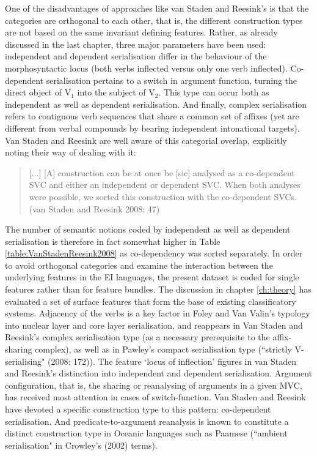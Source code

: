 One of the disadvantages of approaches like van Staden and Reesink's is that the categories are orthogonal to each other, that is, the different construction types are not based on the same invariant defining features. Rather, as already discussed in the last chapter, three major parameters have been used: independent and dependent serialisation differ in the behaviour of the morphosyntactic locus (both verbs inflected versus only one verb inflected). Co-dependent serialisation pertains to a switch in argument function, turning the direct object of V$_1$ into the subject of V$_2$. This type can occur both as independent as well as dependent serialisation. And finally, complex serialisation refers to contiguous verb sequences that share a common set of affixes (yet are different from verbal compounds by bearing independent intonational targets). Van Staden and Reesink are well aware of this categorial overlap, explicitly noting their way of dealing with it: 

\begin{quote}
[...] [A] construction can be at once be [sic] analysed as a co-dependent SVC and either an independent or dependent SVC. When both analyses were possible, we sorted this construction with the co-dependent SVCs. (van Staden and Reesink 2008: 47)
\end{quote}

The number of semantic notions coded by independent as well as dependent serialisation is therefore in fact somewhat higher in Table \ref{table:VanStadenReesink2008} as co-dependency was sorted separately. In order to avoid orthogonal categories and examine the interaction between the underlying features in the EI languages, the present dataset is coded for single features rather than for feature bundles. The discussion in chapter \ref{ch:theory} has evaluated a set of surface features that form the base of existing classificatory systems. Adjacency of the verbs is a key factor in Foley and Van Valin's typology into nuclear layer and core layer serialisation, and reappears in Van Staden and Reesink's complex serialisation type (as a necessary prerequisite to the affix-sharing complex), as well as in Pawley's compact serialisation type (``strictly V-serialising" (2008: 172)). The feature `locus of inflection' figures in van Staden and Reesink's distinction into independent and dependent serialisation. Argument configuration, that is, the sharing or reanalysing of arguments in a given MVC, has received most attention in cases of switch-function. Van Staden and Reesink have devoted a specific construction type to this pattern: co-dependent serialisation. And predicate-to-argument reanalysis is known to constitute a distinct construction type in Oceanic languages such as Paamese (``ambient serialisation" in Crowley's (2002) terms).

